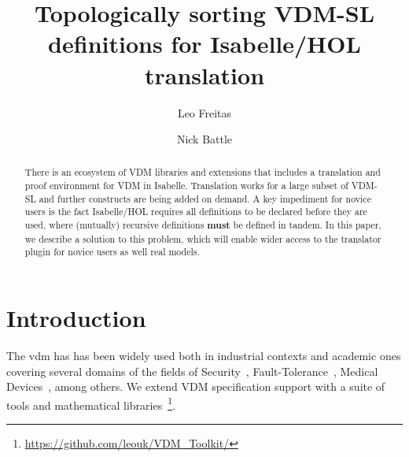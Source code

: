 \documentclass[runningheads,a4paper]{llncs}
\begin{document}
%



\title{Topologically sorting VDM-SL definitions for Isabelle/HOL translation}

\author{Leo Freitas \and Nick Battle
}
\authorrunning{ }

			
\maketitle
\setcounter{footnote}{0} 
\begin{abstract}
    There is an ecosystem of VDM libraries and extensions that includes a translation and proof environment for VDM in Isabelle. Translation works for a large subset of VDM-SL and
    further constructs are being added on demand. A key impediment for novice users is the fact Isabelle/HOL requires 
    all definitions to be declared before they are used, where (mutually) recursive definitions \textbf{must} be defined in tandem. In this paper, we describe a solution to this problem, which will enable wider access to the translator plugin for novice users as well real models.   
\end{abstract}


\section{Introduction}\label{sec:intro}

The \gls{vdm} has has been widely used both in industrial contexts and academic ones covering several domains of the fields of Security~\cite{Kulik&20,Kulik&21a}, Fault-Tolerance~\cite{Nilsson&18}, Medical Devices~\cite{Macedo&08}, among others. We extend VDM specification support with a suite of tools and mathematical libraries~\footnote{\url{https://github.com/leouk/VDM_Toolkit/}}. 
\end{document}
